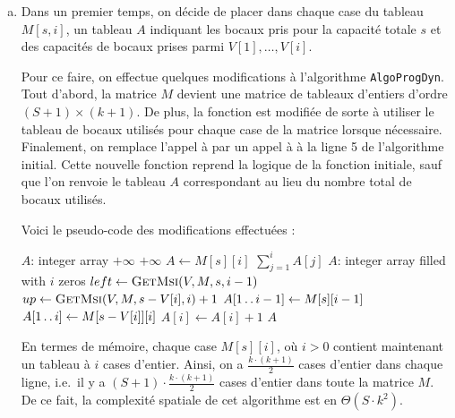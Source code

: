 \documentclass[12pt,a4paper]{article}
\newcommand{\tdots}{\mathinner {\ldotp \ldotp}}
\begin{document}
\begin{enumerate}[a)]
 \item Dans un premier temps, on d\'ecide de placer dans chaque case du tableau $M[s,i]$, un tableau $A$ indiquant les bocaux pris pour la capacit\'e totale $s$ et des capacit\'es de bocaux prises parmi $V[1],\dotsc,V[i]$. 
 
 Pour ce faire, on effectue quelques modifications \`a l'algorithme \texttt{AlgoProgDyn}. Tout d'abord, la matrice $M$ devient une matrice de tableaux d'entiers d'ordre $(S+1) \times (k+1)$. De plus, la fonction  est modifi\'ee de sorte \`a utiliser le tableau de bocaux utilis\'es pour chaque case de la matrice lorsque n\'ecessaire. Finalement, on remplace l'appel \`a   par un appel \`a  \`a la ligne 5 de l'algorithme initial. Cette nouvelle fonction reprend la logique de la fonction  initiale, sauf que l'on renvoie le tableau $A$ correspondant au lieu du nombre total de bocaux utilis\'es. 
 
 Voici le pseudo-code des modifications effectu\'ees :
 
\clearpage
\begin{algorithm}
\begin{algorithmic}[1]
    \State $A$: integer array
        \State {}
        \State \Return $+\infty$
        \State \Return $+\infty$
    \Else
        \State $A \gets M[s][i]$
        \State \Return $\sum_{j=1}^{i} A[j]$
    \EndIf
\EndFunction
\Statex
{}
    \State $A$: integer array filled with $i$ zeros
        \State $left \gets \Call{GetMsi}{V, M, s, i-1}$
        \State $up \gets \Call{GetMsi}{V, M, s-V[i], i}+1$
            \State $A[1 \tdots i-1] \gets M[s][i-1]$
        \Else
            \State $A[1 \tdots i] \gets M[s-V[i]][i]$
            \State $A[i] \gets A[i] + 1$
        \EndIf
    \EndIf
    \State \Return $A$
\EndFunction
\end{algorithmic}
\end{algorithm}

En termes de m\'emoire, chaque case $M[s][i]$, o\`u $i > 0$ contient maintenant un tableau \`a $i$ cases d'entier. Ainsi, on a $\frac{k\cdot (k+1)}{2}$ cases d'entier dans chaque ligne, i.e.\ il y a $(S+1)\cdot \frac{k\cdot (k+1)}{2}$ cases d'entier dans toute la matrice $M$. De ce fait, la complexit\'e spatiale de cet algorithme est en $\Theta(S\cdot k^2)$.
 

\end{enumerate}
\end{document}
